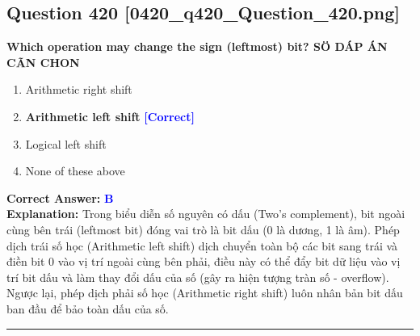 \documentclass[11pt,a4paper]{article}
\begin{document}
\begin{minipage}{\textwidth}
\subsection*{Question 420 \quad \footnotesize{[0420\_q420\_Question\_420.png]}}
\noindent \textbf{Which operation may change the sign (leftmost) bit? SÖ DÁP ÁN CÃN CHON}

\begin{enumerate}[label=\Alph*.]
    \item Arithmetic right shift
    \item \textbf{Arithmetic left shift} \hfill \textcolor{blue}{\textbf{[Correct]}}
    \item Logical left shift
    \item None of these above
\end{enumerate}

\noindent \textbf{Correct Answer:} \textcolor{blue}{\textbf{B}} \\[2pt]
\noindent \textbf{Explanation:} Trong biểu diễn số nguyên có dấu (Two's complement), bit ngoài cùng bên trái (leftmost bit) đóng vai trò là bit dấu (0 là dương, 1 là âm). Phép dịch trái số học (Arithmetic left shift) dịch chuyển toàn bộ các bit sang trái và điền bit 0 vào vị trí ngoài cùng bên phải, điều này có thể đẩy bit dữ liệu vào vị trí bit dấu và làm thay đổi dấu của số (gây ra hiện tượng tràn số - overflow). Ngược lại, phép dịch phải số học (Arithmetic right shift) luôn nhân bản bit dấu ban đầu để bảo toàn dấu của số.

\par\vspace{0.3cm}
\hrule
\vspace{0.3cm}
\end{minipage}
\end{document}
